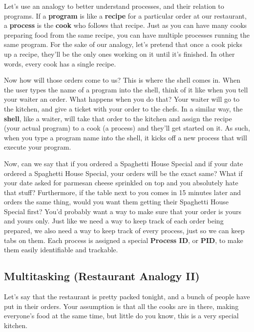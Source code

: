 \documentclass[english, 10pt]{article}
\begin{document}
Let's use an analogy to better understand processes, and their relation to programs. If a \textbf{program} is like a \textbf{recipe} for a particular order at our restaurant, a \textbf{process} is the \textbf{cook} who follows that recipe. Just as you can have many cooks preparing food from the same recipe, you can have multiple processes running the same program. For the sake of our analogy, let's pretend that once a cook picks up a recipe, they'll be the only ones working on it until it's finished. In other words, every cook has a single recipe.\newline

Now how will those orders come to us? This is where the shell comes in. When the user types the name of a program into the shell, think of it like when you tell your waiter an order. What happens when you do that? Your waiter will go to the kitchen, and give a ticket with your order to the chefs. In a similar way, the \textbf{shell}, like a waiter, will take that order to the kitchen and assign the recipe (your actual program) to a cook (a process) and they'll get started on it. As such, when you type a program name into the shell, it kicks off a new process that will execute your program.\newline

Now, can we say that if you ordered a Spaghetti House Special and if your date ordered a Spaghetti House Special, your orders will be the exact same?  What if your date asked for parmesan cheese sprinkled on top and you absolutely hate that stuff? Furthermore, if the table next to you comes in 15 minutes later and orders the same thing, would you want them getting their Spaghetti House Special first? You'd probably want a way to make sure that your order is yours and yours only. Just like we need a way to keep track of each order being prepared, we also need a way to keep track of every process, just so we can keep tabs on them. Each process is assigned a special \textbf{Process ID}, or \textbf{PID}, to make them easily identifiable and trackable.

\subsection{Multitasking (Restaurant Analogy II)}

Let's say that the restaurant is pretty packed tonight, and a bunch of people have put in their orders. Your assumption is that all the cooks are in there, making everyone's food at the same time, but little do you know, this is a very special kitchen.\newline
\end{document}

